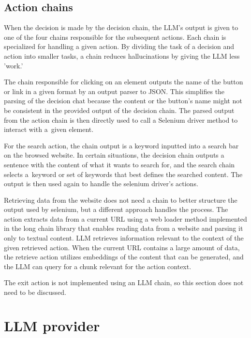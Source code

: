 \subsection{Action chains}

When the decision is made by the decision chain, the LLM's output is given to one of the four chains responsible for the subsequent actions. Each chain is specialized for handling a given action. By dividing the task of a decision and action into smaller tasks, a chain reduces hallucinations by giving the LLM less 'work.' 

The chain responsible for clicking on an element outputs the name of the button or link in a given format by an output parser to JSON. This simplifies the parsing of the decision chat because the content or the button's name might not be consistent in the provided output of the decision chain. The parsed output from the action chain is then directly used to call a Selenium driver method to interact with a~given element. 

For the search action, the chain output is a keyword inputted into a search bar on the browsed website. In certain situations, the decision chain outputs a sentence with the content of what it wants to search for, and the search chain selects a~keyword or set of keywords that best defines the searched content. The output is then used again to handle the selenium driver's actions. 

Retrieving data from the website does not need a chain to better structure the output used by selenium, but a different approach handles the process. The action extracts data from a current URL using a web loader method implemented in the long chain library that enables reading data from a website and parsing it only to textual content. LLM retrieves information relevant to the context of the given retrieved action. When the current URL contains a large amount of data, the retrieve action utilizes embeddings of the content that can be generated, and the LLM can query for a chunk relevant for the action context. 

The exit action is not implemented using an LLM chain, so this section does not need to be discussed. 

\section{LLM provider}
\label{provider}

